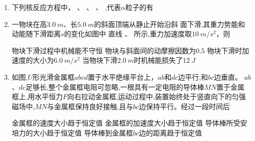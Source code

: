 \begin{enumerate}
\item 
下列核反应方程中，  、  、  、  ,代表$ \alpha $粒子的有  

\fourchoices
{ }
{}
{ }
{ }



\item 
一物块在高$ 3.0 \ m $、长$ 5.0 \ m $的斜面顶端从静止开始沿斜
面下滑,其重力势能和动能随下滑距离$ s $的变化如图中
直线  、  所示,重力加速度取$ 10 \ m/s^{2} $，则  
\begin{figure}[h!]
\centering

\end{figure}



\fourchoices
{物块下滑过程中机械能不守恒}
{物块与斜面间的动摩擦因数为$ 0.5 $}
{物块下滑时加速度的大小为$ 6.0 \ m/s^{2} $}
{当物块下滑$ 2.0 \ m $时机械能损失了$ 12 \ J $}




\item 
如图,$ U $形光滑金属框$ abcd $置于水平绝缘平台上，$ ab $和$ dc $边平行,和$ bc $边垂直。
$ ab $、$ dc $足够长,整个金属框电阻可忽略,一根具有一定电阻的导体棒$ MN $置于金属
框上,用水平恒力$ F $向右拉动金属框,运动过程中,装置始终处于竖直向下的匀强
磁场中,$ MN $与金属框保持良好接触,且与$ bc $边保持平行。经过一段时间后  

\begin{figure}[h!]
\centering

\end{figure}


\fourchoices
{金属框的速度大小趋于恒定值}
{金属框的加速度大小趋于恒定值}
{导体棒所受安培力的大小趋于恒定值}
{导体棒到金属框$ bc $边的距离趋于恒定值}





\gaokaosy


\end{enumerate}
